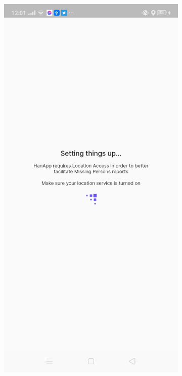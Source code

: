 \begin{figure}[!h]
\begin{subfigure}[c]{0.30\linewidth}
    \end{subfigure}
    \centering
    \begin{subfigure}[c]{0.30\linewidth}
        \centering
        \includegraphics[scale=0.15]{figures/Chapter4/Main/b4-Home.jpg}

\end{subfigure}
\end{figure}
